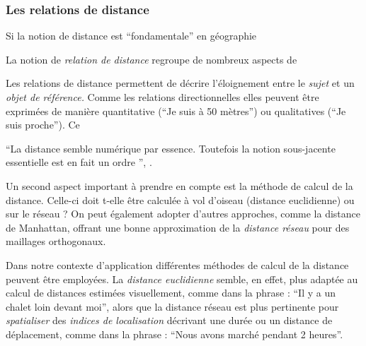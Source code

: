 \subsubsection{Les relations de distance}

Si la notion de distance est \enquote{fondamentale} en géographie
\autocite{Pumain1997}

La notion de \emph{relation de distance} regroupe de nombreux aspects
de  

Les relations de distance permettent de décrire l'éloignement entre le
\emph{sujet} et un \emph{objet de référence.} Comme les relations
directionnelles elles peuvent être exprimées de manière quantitative
(\eg \enquote{Je suis à 50 mètres}) ou qualitatives (\eg \enquote{Je
  suis proche}). Ce


\enquote{La distance \textelp{} semble \textelp{} numérique par
  essence. Toutefois \textelp{} la notion sous-jacente essentielle est
  en fait un ordre \textelp{}}, \textcite{Aurnague1997}.


Un second aspect important à prendre en compte est la méthode de
calcul de la distance. Celle-ci doit t-elle être calculée à vol
d'oiseau (\ie distance euclidienne) ou sur le réseau ? On peut
également adopter d'autres approches, comme la distance de Manhattan,
offrant une bonne approximation de la \emph{distance réseau} pour des
maillages orthogonaux.

Dans notre contexte d’application différentes méthodes de calcul de la
distance peuvent être employées. La \emph{distance euclidienne}
semble, en effet, plus adaptée au calcul de distances estimées
visuellement, comme dans la phrase : \enquote{Il y a un chalet loin
  devant moi}, alors que la distance réseau est plus pertinente pour
\emph{spatialiser} des \emph{indices de localisation} décrivant une
durée ou un distance de déplacement, comme dans la phrase :
\enquote{Nous avons marché pendant 2 heures}.

